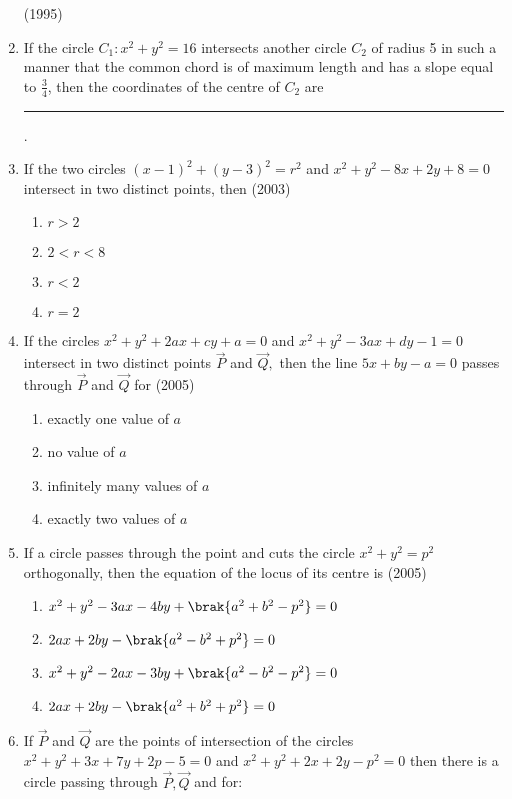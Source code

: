 \begin{enumerate}
	      \hfill(1995)
\item If the circle $C_1:x^{2}+y^{2}=16$ intersects another circle $C_2$ of radius 5 in such a manner that the common chord is of maximum length and has a slope equal to $\frac{3}{4}$,  then the coordinates of the centre of $C_2$ are
\rule{1cm}{0.01pt}.
%
	\hfill{}
\item If the two circles $(x-1)^2+(y-3)^2=r^2$ and $x^2+y^2-8x+2y+8=0$ intersect in two distinct points,  then \hfill(2003)
\begin{multicols}{4}
\begin{enumerate}
\item$r>2$
\item$2<r<8$
\item$r<2$
\item$r=2$
\end{enumerate}
\end{multicols}
\item If the circles $x^2+y^2+2ax+cy+a=0$ and $x^2+y^2-3ax+dy-1=0$ intersect in two distinct points $\vec{P}$ and $\vec{Q},$ then the line $5x+by-a=0$ passes through $\vec{P}$ and $\vec{Q}$ for
\hfill{(2005)}
\begin{multicols}{2}
\begin{enumerate}
\item exactly one value of $a$
\item no value of $a$
\item infinitely many values of $a$
\item exactly two values of $a$
\end{enumerate}
\end{multicols}
\item If a circle passes through the point  and cuts the circle $x^2+y^2=p^2$ orthogonally,  then the equation of the locus of its centre is 
\hfill{(2005)}
\begin{multicols}{2}
\begin{enumerate}
\item $x^2+y^2-3ax-4by+\brak{a^2+b^2-p^2}=0$
\item $2ax+2by-\brak{a^2-b^2+p^2}=0$
\item $x^2+y^2-2ax-3by+\brak{a^2-b^2-p^2}=0$
\item $2ax+2by-\brak{a^2+b^2+p^2}=0$
\end{enumerate}
\end{multicols}
\item If $\vec{P}$ and $\vec{Q}$ are the points of intersection of the circles $x^2+y^2+3x+7y+2p-5=0$ and $x^2+y^2+2x+2y-p^2=0$ then there is a circle passing through $\vec{P},  \vec{Q}$ and  for:

\end{enumerate}
